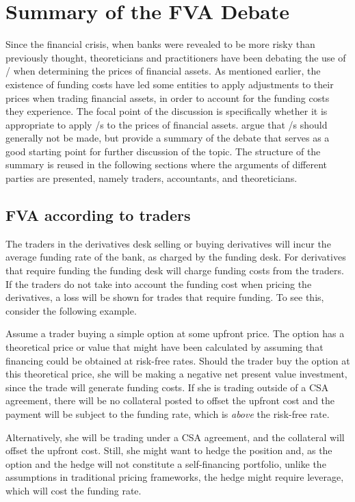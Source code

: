\documentclass[main.tex]{subfiles}
\begin{document}
    \section{Summary of the FVA Debate}
        Since the financial crisis, when banks were revealed to be more risky than previously thought,
        theoreticians and practitioners have been debating the use of \FVA/
        when determining the prices of financial assets.
        As mentioned earlier, the existence of funding costs have led some entities 
        to apply adjustments to their prices when trading financial assets, 
        in order to account for the funding costs they experience.
        The focal point of the discussion is specifically 
        whether it is appropriate to apply \FVA/s to the prices of financial assets.
        \textcite{HullWhiteFVA} argue that \FVA/s should generally not be made,
        but provide a summary of the debate that serves as a good starting point for further discussion of the topic.
        The structure of the summary is reused in the following sections
        where the arguments of different parties are presented,
        namely traders, accountants, and theoreticians.

        \subsection{FVA according to traders}
            The traders in the derivatives desk selling or buying derivatives 
            will incur the average funding rate of the bank, as charged by the funding desk.
            For derivatives that require funding the funding desk will charge funding costs from the traders.
            If the traders do not take into account the funding cost when pricing the derivatives,
            a loss will be shown for trades that require funding.
            To see this, consider the following example.

            \begin{example}
            Assume a trader buying a simple option at some upfront price.
            The option has a theoretical price or value that might have been calculated by assuming
            that financing could be obtained at risk-free rates. 
            Should the trader buy the option at this theoretical price, 
            she will be making a negative net present value investment, 
            since the trade will generate funding costs. 
            If she is trading outside of a CSA agreement, there will be no collateral posted
            to offset the upfront cost and the payment will be subject to the
            funding rate, which is \textit{above} the risk-free rate. 
            
            Alternatively, she will be trading under a CSA agreement,
            and the collateral will offset the upfront cost.
            Still, she might want to hedge the position and, as the option and the hedge
            will not constitute a self-financing portfolio, 
            unlike the assumptions in traditional pricing frameworks,
            the hedge might require leverage, which will cost the funding rate.
            \end{example}
\end{document}
